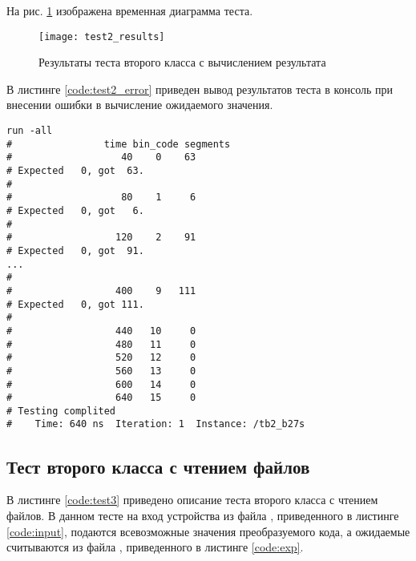 На рис. \ref{fig:test2_results} изображена временная диаграмма теста.
\vspace{-0.5cm}
\begin{figure}[H]
	\begin{center}
		\texttt{[image: test2\_results]}
		\caption{Результаты теста второго класса с вычислением результата}
		\label{fig:test2_results}
	\end{center}
\end{figure}
\vspace{-1cm}

В листинге \ref{code:test2_error} приведен вывод результатов теста в консоль при внесении ошибки в вычисление ожидаемого значения.	
\begin{lstlisting}[caption=Результаты ошибочного теста второго класса с вычислением результата, label=code:test2_error, style=console]
run -all
# 		         time bin_code segments
#                   40    0    63
# Expected   0, got  63.
# 
#                   80    1     6
# Expected   0, got   6.
# 
#                  120    2    91
# Expected   0, got  91.
...
# 
#                  400    9   111
# Expected   0, got 111.
# 
#                  440   10     0
#                  480   11     0
#                  520   12     0
#                  560   13     0
#                  600   14     0
#                  640   15     0
# Testing complited
#    Time: 640 ns  Iteration: 1  Instance: /tb2_b27s
\end{lstlisting}
\vspace{-0.5cm}

\subsection{Тест второго класса с чтением файлов}

В листинге \ref{code:test3} приведено описание теста второго класса с чтением файлов. В данном тесте на вход устройства из файла , приведенного в листинге \ref{code:input}, подаются всевозможные значения преобразуемого кода, а ожидаемые считываются из файла , приведенного в листинге \ref{code:exp}. 

\begin{multicols}{2}
		
	
\end{multicols}

